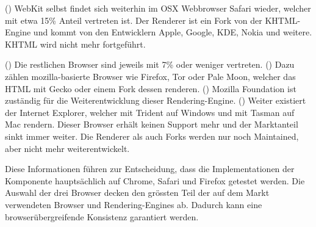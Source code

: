 (\cite{webkitRenderer}) WebKit selbst findet sich weiterhin im OSX Webbrowser Safari wieder, welcher mit etwa 15\% Anteil vertreten ist.
Der Renderer ist ein Fork von der KHTML-Engine und kommt von den Entwicklern Apple, Google, KDE, Nokia und weitere. 
KHTML wird nicht mehr fortgeführt.

(\cite{geckoRenderer}) Die restlichen Browser sind jeweils mit 7\% oder weniger vertreten.
(\cite{mozillaBrowser}) Dazu zählen mozilla-basierte Browser wie Firefox, Tor oder Pale Moon, welcher das HTML mit Gecko oder einem Fork dessen renderen.
(\cite{geckoRenderer}) Mozilla Foundation ist zuständig für die Weiterentwicklung dieser Rendering-Engine.
(\cite{otherRenderer}) Weiter existiert der Internet Explorer, welcher mit Trident auf Windows und mit Tasman auf Mac rendern.
Dieser Browser erhält keinen Support mehr und der Marktanteil sinkt immer weiter.
Die Renderer als auch Forks werden nur noch Maintained, aber nicht mehr weiterentwickelt.

Diese Informationen führen zur Entscheidung, dass die Implementationen der Komponente hauptsächlich auf Chrome, Safari und Firefox getestet werden.
Die Auswahl der drei Browser decken den grössten Teil der auf dem Markt verwendeten Browser und Rendering-Engines ab.
Dadurch kann eine browserübergreifende Konsistenz garantiert werden.
